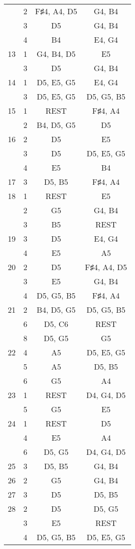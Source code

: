 \documentclass{article}
\begin{document}
\begin{longtable}{|c|c|c|c|}
  & 2 & F♯4, A4, D5 & G4, B4 \\ 
  & 3 & D5 & G4, B4 \\ 
  & 4 & B4 & E4, G4 \\ 
\hline
13 & 1 & G4, B4, D5 & E5 \\ 
  & 3 & D5 & G4, B4 \\ 
\hline
14 & 1 & D5, E5, G5 & E4, G4 \\ 
  & 3 & D5, E5, G5 & D5, G5, B5 \\ 
\hline
15 & 1 & REST & F♯4, A4 \\ 
  & 2 & B4, D5, G5 & D5 \\ 
\hline
16 & 2 & D5 & E5 \\ 
  & 3 & D5 & D5, E5, G5 \\ 
  & 4 & E5 & B4 \\ 
\hline
17 & 3 & D5, B5 & F♯4, A4 \\ 
\hline
18 & 1 & REST & E5 \\ 
  & 2 & G5 & G4, B4 \\ 
  & 3 & B5 & REST \\ 
\hline
19 & 3 & D5 & E4, G4 \\ 
  & 4 & E5 & A5 \\ 
\hline
20 & 2 & D5 & F♯4, A4, D5 \\ 
  & 3 & E5 & G4, B4 \\ 
  & 4 & D5, G5, B5 & F♯4, A4 \\ 
\hline
21 & 2 & B4, D5, G5 & D5, G5, B5 \\ 
  & 6 & D5, C6 & REST \\ 
  & 8 & D5, G5 & G5 \\ 
\hline
22 & 4 & A5 & D5, E5, G5 \\ 
  & 5 & A5 & D5, B5 \\ 
  & 6 & G5 & A4 \\ 
\hline
23 & 1 & REST & D4, G4, D5 \\ 
  & 5 & G5 & E5 \\ 
\hline
24 & 1 & REST & D5 \\ 
  & 4 & E5 & A4 \\ 
  & 6 & D5, G5 & D4, G4, D5 \\ 
\hline
25 & 3 & D5, B5 & G4, B4 \\ 
\hline
26 & 2 & G5 & G4, B4 \\ 
\hline
27 & 3 & D5 & D5, B5 \\ 
\hline
28 & 2 & D5 & D5, G5 \\ 
  & 3 & E5 & REST \\ 
  & 4 & D5, G5, B5 & D5, E5, G5 \\ 

\end{longtable}
\end{document}
